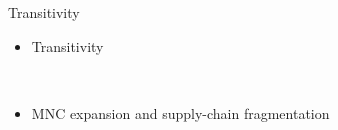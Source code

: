 \documentclass{beamer}
\begin{document}
\begin{frame}{Transitivity}

\begin{itemize}
\item{Transitivity}

\\
\justifying
\item{MNC expansion and supply-chain fragmentation}

\end{itemize}



\end{frame}
\end{document}
